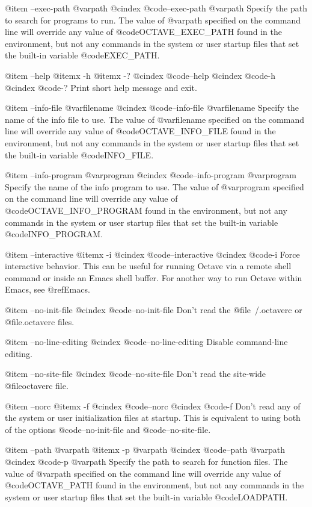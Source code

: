 @item --exec-path @var{path}
@cindex @code{--exec-path @var{path}}
Specify the path to search for programs to run.  The value of @var{path}
specified on the command line will override any value of
@code{OCTAVE_EXEC_PATH} found in the environment, but not any commands
in the system or user startup files that set the built-in variable
@code{EXEC_PATH}.

@item --help
@itemx -h
@itemx -?
@cindex @code{--help}
@cindex @code{-h}
@cindex @code{-?}
Print short help message and exit.

@item --info-file @var{filename}
@cindex @code{--info-file @var{filename}}
Specify the name of the info file to use.  The value of @var{filename}
specified on the command line will override any value of
@code{OCTAVE_INFO_FILE} found in the environment, but not any commands
in the system or user startup files that set the built-in variable
@code{INFO_FILE}.

@item --info-program @var{program}
@cindex @code{--info-program @var{program}}
Specify the name of the info program to use.  The value of @var{program}
specified on the command line will override any value of
@code{OCTAVE_INFO_PROGRAM} found in the environment, but not any
commands in the system or user startup files that set the built-in
variable @code{INFO_PROGRAM}.

@item --interactive
@itemx -i
@cindex @code{--interactive}
@cindex @code{-i}
Force interactive behavior.  This can be useful for running Octave via a
remote shell command or inside an Emacs shell buffer.  For another way
to run Octave within Emacs, see @ref{Emacs}.

@item --no-init-file
@cindex @code{--no-init-file}
Don't read the @file{~/.octaverc} or @file{.octaverc} files.

@item --no-line-editing
@cindex @code{--no-line-editing}
Disable command-line editing.

@item --no-site-file
@cindex @code{--no-site-file}
Don't read the site-wide @file{octaverc} file.

@item --norc
@itemx -f
@cindex @code{--norc}
@cindex @code{-f}
Don't read any of the system or user initialization files at startup.
This is equivalent to using both of the options @code{--no-init-file}
and @code{--no-site-file}.

@item --path @var{path}
@itemx -p @var{path}
@cindex @code{--path @var{path}}
@cindex @code{-p @var{path}}
Specify the path to search for function files.  The value of @var{path}
specified on the command line will override any value of
@code{OCTAVE_PATH} found in the environment, but not any commands in the
system or user startup files that set the built-in variable @code{LOADPATH}.

